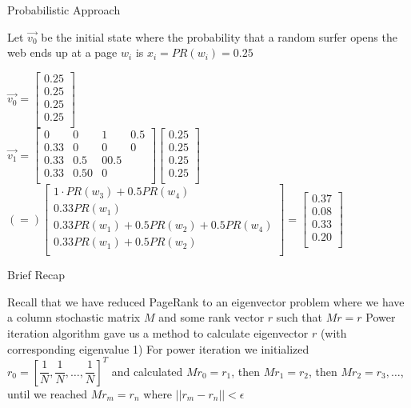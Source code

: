 \documentclass{beamer}
\begin{document}
\begin{frame}[t]{Probabilistic Approach}
\begin{outline}
    \1 Let $\vec{v_0}$ be the initial state where the probability that a random surfer opens the web ends up at a page $w_i$ is $x_i = PR(w_i) = 0.25$
    \begin{center}
        $\vec{v_0} = \begin{bmatrix}
            0.25\\0.25\\0.25\\0.25\\
        \end{bmatrix}$\\
        $\vec{v_1} = \begin{bmatrix}
            0 & 0 & 1 & 0.5\\
            0.33 & 0 & 0 & 0\\
            0.33 & 0.5 & 0 0.5\\
            0.33 & 0.5 0 & 0\\
        \end{bmatrix}\begin{bmatrix}
            0.25\\0.25\\0.25\\0.25\\
        \end{bmatrix}$\\
        $(=) \begin{bmatrix}
            1\cdot PR(w_3) + 0.5 PR(w_4)\\
            0.33PR(w_1)\\
            0.33PR(w_1) + 0.5PR(w_2) + 0.5PR(w_4)\\
            0.33PR(w_1) + 0.5PR(w_2)\\
        \end{bmatrix} = \begin{bmatrix}
            0.37\\0.08\\0.33\\0.20\\
        \end{bmatrix}$
    \end{center}
    
\end{outline}
\end{frame}

\begin{frame}[t]{Brief Recap}
\begin{outline}
    \1 Recall that we have reduced PageRank to an eigenvector problem where we have a column stochastic matrix $M$ and some rank vector $r$ such that $Mr = r$
    \1 Power iteration algorithm gave us a method to calculate eigenvector $r$ (with corresponding eigenvalue 1)
    \1 For power iteration we initialized $r_0 = \left[ \dfrac{1}{N}, \dfrac{1}{N}, \ldots, \dfrac{1}{N}\right]^T$ and calculated $Mr_0 = r_1$, then $Mr_1 = r_2$, then $Mr_2 = r_3, \ldots$, until we reached $Mr_m = r_n$ where $||r_m - r_n|| < \epsilon$
\end{outline}
\end{frame}
\end{document}
